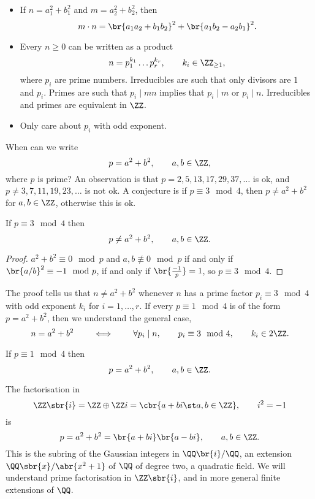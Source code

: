 \begin{itemize}
\item If $ n = a_1^2 + b_1^2 $ and $ m = a_2^2 + b_2^2 $, then
$$ m \cdot n = \br{a_1a_2 + b_1b_2}^2 + \br{a_1b_2 - a_2b_1}^2. $$
\item Every $ n \ge 0 $ can be written as a product
$$ n = p_1^{k_1} \dots p_r^{k_r}, \qquad k_i \in \ZZ_{\ge 1}, $$
where $ p_i $ are prime numbers. Irreducibles are such that only divisors are $ 1 $ and $ p_i $. Primes are such that $ p_i \mid mn $ implies that $ p_i \mid m $ or $ p_i \mid n $. Irreducibles and primes are equivalent in $ \ZZ $.
\item Only care about $ p_i $ with odd exponent.
\end{itemize}

When can we write
$$ p = a^2 + b^2, \qquad a, b \in \ZZ, $$
where $ p $ is prime? An observation is that $ p = 2, 5, 13, 17, 29, 37, \dots $ is ok, and $ p \ne 3, 7, 11, 19, 23, \dots $ is not ok. A conjecture is if $ p \equiv 3 \mod 4 $, then $ p \ne a^2 + b^2 $ for $ a, b \in \ZZ $, otherwise this is ok.

\pagebreak

\begin{theorem}
If $ p \equiv 3 \mod 4 $ then
$$ p \ne a^2 + b^2, \qquad a, b \in \ZZ. $$
\end{theorem}

\begin{proof}
$ a^2 + b^2 \equiv 0 \mod p $ and $ a, b \not\equiv 0 \mod p $ if and only if $ \br{a / b}^2 \equiv -1 \mod p $, if and only if $ \br{\tfrac{-1}{p}} = 1 $, so $ p \equiv 3 \mod 4 $.
\end{proof}

\begin{remark*}
The proof tells us that $ n \ne a^2 + b^2 $ whenever $ n $ has a prime factor $ p_i \equiv 3 \mod 4 $ with odd exponent $ k_i $ for $ i = 1, \dots, r $. If every $ p \equiv 1 \mod 4 $ is of the form $ p = a^2 + b^2 $, then we understand the general case,
$$ n = a^2 + b^2 \qquad \iff \qquad \forall p_i \mid n, \qquad p_i \equiv 3 \mod 4, \qquad k_i \in 2\ZZ. $$
\end{remark*}

\begin{theorem}
If $ p \equiv 1 \mod 4 $ then
$$ p = a^2 + b^2, \qquad a, b \in \ZZ. $$
\end{theorem}

The factorisation in
$$ \ZZ\sbr{i} = \ZZ \oplus \ZZ i = \cbr{a + bi \st a, b \in \ZZ}, \qquad i^2 = -1 $$
is
$$ p = a^2 + b^2 = \br{a + bi}\br{a - bi}, \qquad a, b \in \ZZ. $$
This is the subring of the Gaussian integers in $ \QQ\br{i} / \QQ $, an extension $ \QQ\sbr{x} / \abr{x^2 + 1} $ of $ \QQ $ of degree two, a quadratic field. We will understand prime factorisation in $ \ZZ\sbr{i} $, and in more general finite extensions of $ \QQ $.

